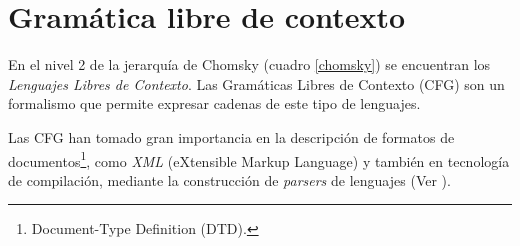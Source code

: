 

\section{Gramática libre de contexto}
\label{sec:def-CFG}
En el nivel 2 de la jerarquía de Chomsky (cuadro \ref{chomsky}) se encuentran los \textit{Lenguajes Libres de Contexto}. Las Gramáticas Libres de Contexto (CFG) son un formalismo que permite expresar cadenas de este tipo de lenguajes.

Las CFG han tomado gran importancia en la descripción de formatos de documentos\footnote{Document-Type Definition (DTD).}, como \textit{XML} (eXtensible Markup Language) y también en tecnología de compilación, mediante la construcción de \textit{parsers} de lenguajes (Ver \cite{compiladores}).  

